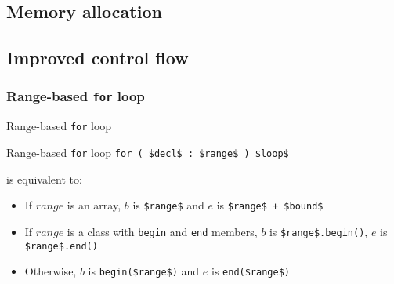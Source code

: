 \subsection{Memory allocation}



\subsection{Improved control flow}

\subsubsection{Range-based \texttt{for} loop}

\begin{frame}{Range-based \texttt{for} loop}{}
  \begin{block}{Range-based \texttt{for} loop}
    {
      \hfill\lstinline[mathescape]!for ( $decl$ : $range$ ) $loop$!\hfill
    }

    is equivalent to:

    \smaller

    \begin{itemize}
    \item
      If $range$ is an array, $b$ is \lstinline[mathescape]!$range$! and $e$ is \lstinline[mathescape]!$range$ + $bound$!
    \item
      If $range$ is a class with \lstinline!begin! and \lstinline!end! members, $b$ is \lstinline[mathescape]!$range$.begin()!, $e$ is \lstinline[mathescape]!$range$.end()!
    \item
      Otherwise, $b$ is \lstinline[mathescape]!begin($range$)! and $e$ is \lstinline[mathescape]!end($range$)!
    \end{itemize}
  \end{block}
\end{frame}

